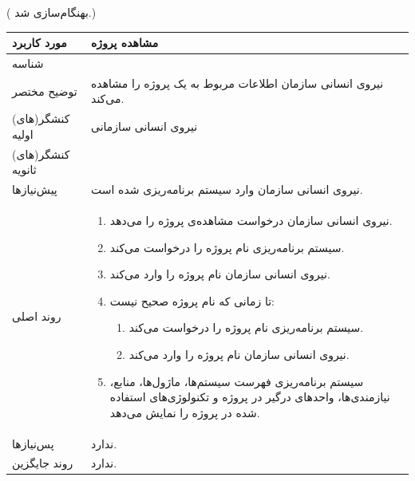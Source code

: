 ({\color{red} بهنگام‌سازی شد.})
\begin{table}[H]
	\centering
	\begin{tabular}{|p{3cm}|p{10cm}|}
		\hline
		
		مورد کاربرد & مشاهده پروژه  \\
		\hline
		
		شناسه & 
		\stepcounter{usecase_ID}
		
		\arabic{usecase_ID} \\
		\hline
		
		توضیح مختصر & نیروی انسانی سازمان اطلاعات مربوط به یک پروژه را مشاهده می‌کند. \\
		\hline
		
		کنشگر(های) اولیه & نیروی انسانی سازمانی \\
		\hline
		
		کنشگر(های) ثانویه &  \\
		\hline
		
		پیش‌نیازها & نیروی انسانی سازمان وارد سیستم برنامه‌ریزی شده است. \\
		\hline
		
		
		روند اصلی &
		\begin{enumerate}[topsep=0cm,leftmargin=0.5cm]
			
			\item نیروی انسانی سازمان درخواست مشاهده‌ی پروژه را می‌دهد. 
			\item سیستم برنامه‌ریزی نام پروژه را درخواست می‌کند. 
			\item نیروی انسانی سازمان نام پروژه را وارد می‌کند. 
			\item تا زمانی که نام پروژه صحیح نیست: 
			\begin{enumerate}[topsep=0cm,leftmargin=0.5cm]
				\item سیستم برنامه‌ریزی نام پروژه را درخواست می‌کند. 
				\item نیروی انسانی سازمان نام پروژه را وارد می‌کند.
			\end{enumerate}
			\item سیستم برنامه‌ریزی فهرست سیستم‌ها، ماژول‌ها، منابع، نیازمندی‌ها، واحدهای درگیر در پروژه و تکنولوژی‌های استفاده شده در پروژه را نمایش می‌دهد.
		\end{enumerate} \\
		\hline
		
		
		پس‌نیازها & ندارد. \\
		\hline
		
		روند جایگزین & ندارد. \\
		\hline
		
	\end{tabular}
\end{table}


